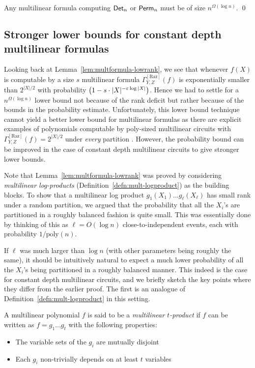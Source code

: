 \documentclass{birkjour}
\newcommand{\CM}[1]{\Gamma^{\mathrm{[#1]}}}
\renewcommand{\epsilon}{\varepsilon}
\begin{document}
\begin{theorem} Any multilinear formula computing $\mathsf{Det}_n$ or $\mathsf{Perm}_n$ must be of size $n^{\Omega(\log n)}$. \qed
\end{theorem}


\subsection{Stronger lower bounds for constant depth multilinear formulas}

Looking back at Lemma~\ref{lem:multformula-lowrank}, we see that whenever $f(X)$ is computable by a size $s$ multilinear formula $\CM{Raz}_{Y,Z}(f)$ is exponentially smaller than $2^{|X|/2}$ with probability $\inparen{1 - s\cdot |X|^{-\epsilon \log |X|}}$. Hence we had to settle for a $n^{\Omega(\log n)}$ lower bound not because of the rank deficit but rather because of the bounds in the probability estimate. Unfortunately, this lower bound technique cannot yield a better lower bound for multilinear formulas as there are explicit examples of polynomials computable by poly-sized multilinear circuits with $\CM{Raz}_{Y,Z}(f) = 2^{|X|/2}$ under \emph{every} partition \cite{Raz06}. However, the probability bound can be improved in the case of constant depth multilinear circuits to give stronger lower bounds. 


Note that Lemma~\ref{lem:multformula-lowrank} was proved by considering \emph{multilinear log-products} (Definition~\ref{defn:mult-logproduct}) as the building blocks. To show that a multilinear log product $g_1(X_1)\dots g_{\ell}(X_\ell)$ has small rank under a random partition, we argued that the probability that all the $X_i$'s are partitioned in a roughly balanced fashion is quite small. This was essentially done by thinking of this as $\ell = O(\log n)$ close-to-independent events, each with probability $1/\mathrm{poly}(n)$. 

If $\ell$ was much larger than $\log n$ (with other parameters being roughly the same), it should be intuitively natural to expect a much lower probability of all the $X_i$'s being partitioned in a roughly balanced manner. This indeed is the case for constant depth multilinear circuits, and we briefly sketch the key points where they differ from the earlier proof. The first is an analogue of Definition~\ref{defn:mult-logproduct} in this setting. 

\begin{definition}\label{defn:mult-t-prod}
A multilinear polynomial $f$ is said to be a \emph{multilinear $t$-product} if $f$ can be written as $f = g_1\dots g_t$ with the following properties:
\begin{itemize}
\item The variable sets of the $g_i$ are mutually disjoint
\item Each $g_i$ non-trivially depends on at least $t$ variables
\end{itemize}
\end{definition}
\end{document}
